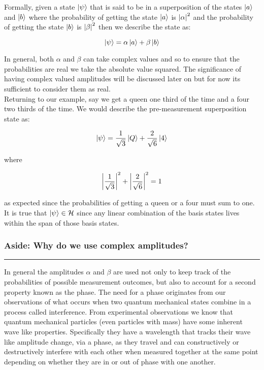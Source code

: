 Formally, given a state $\left\vert{\psi}\right\rangle$ that is said to be in a superposition of the states $\left\vert{a}\right\rangle$ and $\left\vert{b}\right\rangle$ where the probability of getting the state $\left\vert{a}\right\rangle$ is $\abs{\alpha}^{2}$ and the probability of getting the state $\left\vert{b}\right\rangle$ is $\abs{\beta}^{2}$ then we describe the state as:

\begin{equation}
\left\vert{\psi}\right\rangle = \alpha \left\vert{a}\right\rangle + \beta \left\vert{b}\right\rangle
\end{equation}

In general, both $\alpha$ and $\beta$ can take complex values and so to ensure that the probabilities are real we take the absolute value squared. The significance of having complex valued amplitudes will be discussed later on but for now its sufficient to consider them as real.\\

Returning to our example, say we get a queen one third of the time and a four two thirds of the time. We would describe the pre-measurement superposition state as:

\begin{equation}
\left\vert{\psi}\right\rangle = \frac{1}{\sqrt{3}} \left\vert{Q}\right\rangle + \frac{2}{\sqrt{6}}  \left\vert{4}\right\rangle
\end{equation}

where

\begin{equation}
\abs{\frac{1}{\sqrt{3}}}^{2}+ \abs{\frac{2}{\sqrt{6}}}^{2} =1
\end{equation}

as expected since the probabilities of getting a queen or a four must sum to one. It is true that $\left\vert{\psi}\right\rangle \in \mathcal{H}$ since any linear combination of the basis states lives within the span of those basis states. 

\newpage
\subsubsection{Aside: Why do we use complex amplitudes?}
\hrule
In general the amplitudes $\alpha$ and $\beta$ are used not only to keep track of the probabilities of possible measurement outcomes, but also to account for a second property known as the phase. The need for a phase originates from our observations of what occurs when two quantum mechanical states combine in a process called interference. From experimental observations we know that quantum mechanical particles (even particles with mass) have some inherent wave like properties. Specifically they have a wavelength that tracks their wave like amplitude change, via a phase, as they travel and can constructively or destructively interfere with each other when measured together at the same point depending on whether they are in or out of phase with one another.\\

